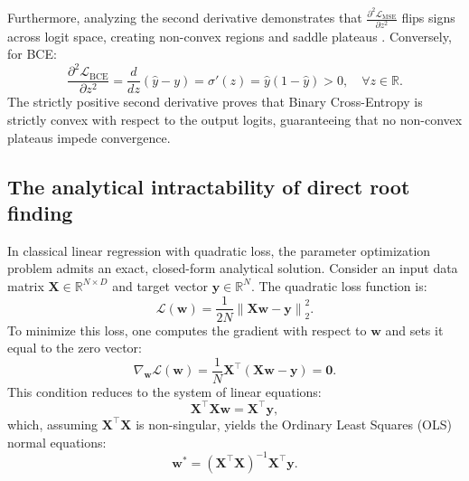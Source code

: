 \documentclass[../../main.tex]{subfiles}
\begin{document}
Furthermore, analyzing the second derivative demonstrates that $\frac{\partial^2 \mathcal{L}_{\text{MSE}}}{\partial z^2}$ flips signs across logit space, creating non-convex regions and saddle plateaus \citep{goodfellow2016}. Conversely, for BCE:
\begin{equation}
\frac{\partial^2 \mathcal{L}_{\text{BCE}}}{\partial z^2} = \frac{d}{dz}\left(\hat{y} - y\right) = \sigma'(z) = \hat{y}\left(1 - \hat{y}\right) > 0, \quad \forall z \in \mathbb{R}.
\end{equation}
The strictly positive second derivative proves that Binary Cross-Entropy is strictly convex with respect to the output logits, guaranteeing that no non-convex plateaus impede convergence.

\subsection{The analytical intractability of direct root finding}
\label{subsec:intractability_root_finding}

In classical linear regression with quadratic loss, the parameter optimization problem admits an exact, closed-form analytical solution. Consider an input data matrix $\mathbf{X} \in \mathbb{R}^{N \times D}$ and target vector $\mathbf{y} \in \mathbb{R}^N$. The quadratic loss function is:
\begin{equation}
\mathcal{L}(\mathbf{w}) = \frac{1}{2N} \left\| \mathbf{X}\mathbf{w} - \mathbf{y} \right\|_2^2.
\end{equation}
To minimize this loss, one computes the gradient with respect to $\mathbf{w}$ and sets it equal to the zero vector:
\begin{equation}
\nabla_{\mathbf{w}} \mathcal{L}(\mathbf{w}) = \frac{1}{N} \mathbf{X}^\top \left( \mathbf{X}\mathbf{w} - \mathbf{y} \right) = \mathbf{0}.
\end{equation}
This condition reduces to the system of linear equations:
\begin{equation}
\mathbf{X}^\top \mathbf{X}\mathbf{w} = \mathbf{X}^\top \mathbf{y},
\end{equation}
which, assuming $\mathbf{X}^\top \mathbf{X}$ is non-singular, yields the Ordinary Least Squares (OLS) normal equations:
\begin{equation}
\mathbf{w}^* = \left( \mathbf{X}^\top \mathbf{X} \right)^{-1} \mathbf{X}^\top \mathbf{y}.
\end{equation}
\end{document}
